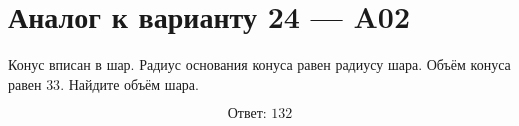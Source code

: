 \documentclass[12pt,a4paper]{article}
\begin{document}
\section*{Аналог к варианту 24 — A02}

Конус вписан в шар. Радиус основания конуса равен радиусу шара. Объём конуса равен \(33\). Найдите объём шара.

\begin{center}
\end{center}

\[
\boxed{\text{Ответ: }132}
\]
\end{document}
